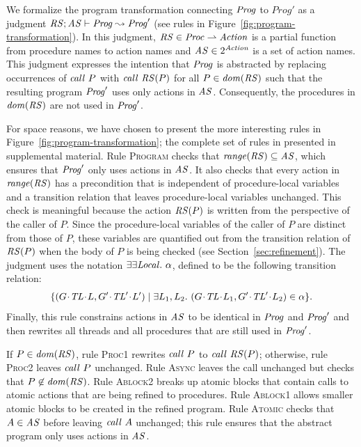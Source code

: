 We formalize the program transformation connecting $\mathit{Prog}$ to $Prog'$ as a judgment
$\mathit{RS};\mathit{AS} \vdash \mathit{Prog} \leadsto \mathit{Prog}'$ (see rules in Figure~\ref{fig:program-transformation}).
In this judgment,
$\mathit{RS} \in \mathit{Proc} \rightharpoonup \mathit{Action}$ is a partial function from procedure names to action names
and $\mathit{AS} \in 2^{\mathit{Action}}$ is a set of action names.
This judgment expresses the intention that $\mathit{Prog}$ is abstracted by replacing
occurrences of $\mathit{call}\ P$ with $\mathit{call}\ \mathit{RS}(P)$ for all $P \in \mathit{dom}(\mathit{RS})$ such that 
the resulting program $\mathit{Prog}'$ uses only actions in $\mathit{AS}$.
Consequently, the procedures in $\mathit{dom}(\mathit{RS})$ are not used in $\mathit{Prog}'$.

For space reasons, we have chosen to present the more interesting rules in Figure~\ref{fig:program-transformation};
the complete set of rules in presented in supplemental material.
Rule \textsc{Program} checks that $\mathit{range}(\mathit{RS}) \subseteq \mathit{AS}$,
which ensures that $\mathit{Prog}'$ only uses actions in $\mathit{AS}$.
It also checks that every action in $\mathit{range}(\mathit{RS})$ has a precondition 
that is independent of procedure-local variables and a transition relation that leaves 
procedure-local variables unchanged.  
This check is meaningful because the action $\mathit{RS}(P)$ is written from the 
perspective of the caller of $P$.
Since the procedure-local variables of the caller of $P$ are distinct from those of $P$,
these variables are quantified out from the transition relation of $\mathit{RS}(P)$ when 
the body of $P$ is being checked (see Section~\ref{sec:refinement}).
The judgment uses the notation $\exists\exists {\mathit{Local}}.\ \alpha$, defined to be the following transition relation:
\[\{(\MakeStore{\varsG}{\varsTL}{\varsL}, \MakeStore{\varsG'}{\varsTL'}{\varsL'}) \mid \exists \varsL_1,\varsL_2.\ (\MakeStore{\varsG}{\varsTL}{\varsL_1}, \MakeStore{\varsG'}{\varsTL'}{\varsL_2}) \in \alpha \}.\]
Finally, this rule constrains actions in $\mathit{AS}$ to be identical in $\mathit{Prog}$ and $\mathit{Prog}'$ and then rewrites all threads
and all procedures that are still used in $\mathit{Prog}'$.

If $P \in \mathit{dom}(\mathit{RS})$, rule \textsc{Proc1} rewrites $\mathit{call}\ P$ to $\mathit{call}\ \mathit{RS}(P)$;
otherwise, rule \textsc{Proc2} leaves $\mathit{call}\ P$ unchanged.
Rule \textsc{Async} leaves the call unchanged but checks that $P \not \in \mathit{dom}(\mathit{RS})$.
Rule \textsc{Ablock2} breaks up atomic blocks that contain calls
to atomic actions that are being refined to procedures.
Rule \textsc{Ablock1} allows smaller atomic blocks to be created in the refined program.
Rule \textsc{Atomic} checks that $A \in \mathit{AS}$ before leaving $\mathit{call}\ A$ unchanged;
this rule ensures that the abstract program only uses actions in $\mathit{AS}$.

